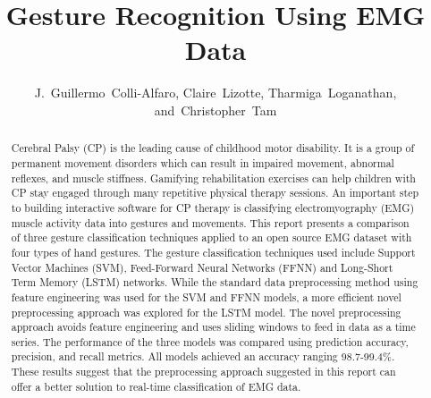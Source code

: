 \documentclass[journal]{IEEEtran}
\begin{document}
	\title{Gesture Recognition Using EMG Data}
	
	\author{
		J.~Guillermo~Colli-Alfaro, Claire~Lizotte, Tharmiga~Loganathan, and~Christopher~Tam%
		
	}
	
	
	
	
	
	\maketitle
	
	\begin{abstract}
		Cerebral Palsy (CP) is the leading cause of childhood motor disability. It is a group of permanent movement disorders which can result in impaired movement, abnormal reflexes, and muscle stiffness. Gamifying rehabilitation exercises can help children with CP stay engaged through many repetitive physical therapy sessions. An important step to building interactive software for CP therapy is classifying electromyography (EMG) muscle activity data into gestures and movements. This report presents a comparison of three gesture classification techniques applied to an open source EMG dataset with four types of hand gestures. The gesture classification techniques used include Support Vector Machines (SVM), Feed-Forward Neural Networks (FFNN) and Long-Short Term Memory (LSTM) networks. While the standard data preprocessing method using feature engineering was used for the SVM and FFNN models, a more efficient novel preprocessing approach was explored for the LSTM model. The novel preprocessing approach avoids feature engineering and uses sliding windows to feed in data as a time series. The performance of the three models was compared using prediction accuracy, precision, and recall metrics. All models achieved an accuracy ranging 98.7-99.4\%. These results suggest that the preprocessing approach suggested in this report can offer a better solution to real-time classification of EMG data.
		
	\end{abstract}
	
\end{document}
